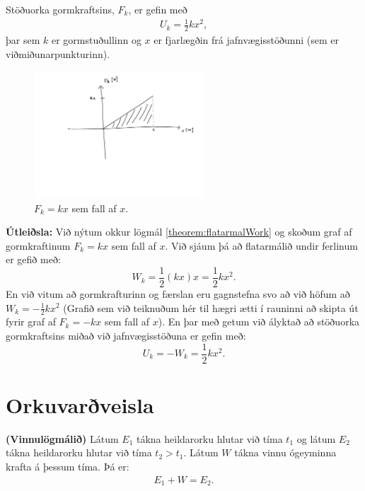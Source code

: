 \begin{tcolorbox}
\begin{theorem}
Stöðuorka gormkraftsins, $F_k$, er gefin með
\begin{align*}
    U_k = \frac{1}{2}kx^2,
\end{align*}
þar sem $k$ er gormstuðullinn og $x$ er fjarlægðin frá jafnvægisstöðunni (sem er viðmiðunarpunkturinn).
\end{theorem}
\end{tcolorbox}

\begin{minipage}{\linewidth}
\begin{figure}
\includegraphics[width=2.5in]{temp/gormkraftur2.pdf}
\caption{$F_k = kx$ sem fall af $x$.}
\label{fig:gorm-work}
\end{figure}

\textbf{Útleiðsla:} Við nýtum okkur lögmál \ref{theorem:flatarmalWork} og skoðum graf af gormkraftinum $F_k = kx$ sem fall af $x$. Við sjáum þá að flatarmálið undir ferlinum er gefið með:
\begin{equation*}
    W_k = \frac{1}{2}(kx)x = \frac{1}{2}kx^2.
\end{equation*}
En við vitum að gormkrafturinn og færslan eru gagnstefna svo að við höfum að $W_k = -\frac{1}{2}kx^2$ (Grafið sem við teiknuðum hér til hægri ætti í rauninni að skipta út fyrir graf af $F_k = -kx$ sem fall af $x$). En þar með getum við ályktað að stöðuorka gormkraftsins miðað við jafnvægisstöðuna er gefin með:
\begin{equation*}
    U_k = -W_k = \frac{1}{2}kx^2.
\end{equation*}

\end{minipage}

\section{Orkuvarðveisla}


\begin{tcolorbox}
\begin{theorem}
\textbf{(Vinnulögmálið)} Látum $E_1$ tákna heildarorku hlutar við tíma $t_1$ og látum $E_2$ tákna heildarorku hlutar við tíma $t_2 > t_1$. Látum $W$ tákna vinnu ógeyminna krafta á þessum tíma. Þá er:
\begin{align*}
    E_1 + W = E_2.
\end{align*}
\end{theorem}
\end{tcolorbox}


